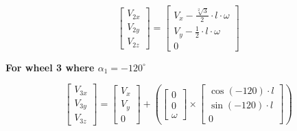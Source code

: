 \documentclass[answers]{exam}
\begin{document}
\begin{questions}
\begin{solution}
        \begin{equation} \label{eq:2}
            \begin{bmatrix}
                V_{2x} \\
                V_{2y} \\
                V_{2z}
            \end{bmatrix}
            = \begin{bmatrix}
                V_x - \frac{\sqrt[2]{3}}{2} \cdot l \cdot \omega \\
                V_y - \frac{1}{2} \cdot l \cdot \omega           \\
                0
            \end{bmatrix}
        \end{equation}

        \textbf{For wheel 3 where $\alpha_1 = - 120^\circ$}

        \begin{equation*}
            \begin{bmatrix}
                V_{3x} \\
                V_{3y} \\
                V_{3z}
            \end{bmatrix}
            = \begin{bmatrix}
                V_x \\
                V_y \\
                0
            \end{bmatrix}
            + \left(\begin{bmatrix}
                0 \\
                0 \\
                \omega
            \end{bmatrix} \times \begin{bmatrix}
                \cos(- 120) \cdot l \\
                \sin(- 120) \cdot l \\
                0
            \end{bmatrix}\right)
        \end{equation*}


\end{solution}
\end{questions}
\end{document}
